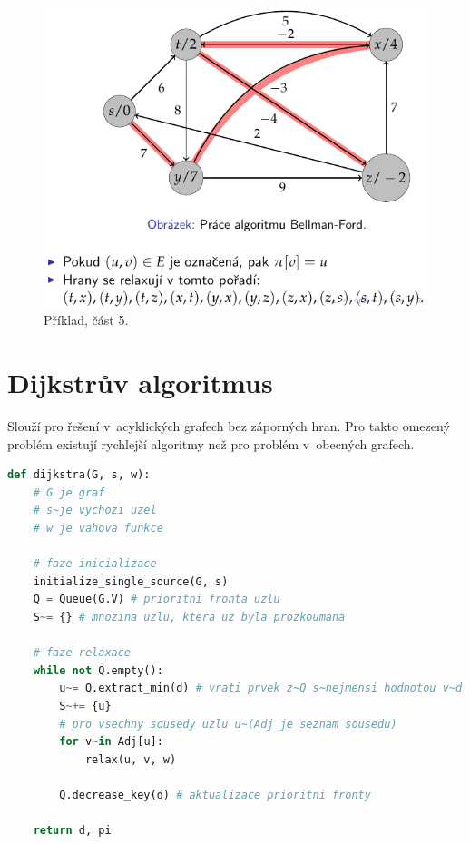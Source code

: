 \begin{figure}[H]
    \centering
    \includegraphics[width=0.75\linewidth]{example_bellman_ford_p5.pdf}
    \caption{Příklad, část 5.}
\end{figure}


\section{Dijkstrův algoritmus}

Slouží pro řešení v~acyklických grafech bez záporných hran. Pro takto omezený problém existují rychlejší algoritmy než pro problém v~obecných grafech.

\bigskip\noindent\begin{minipage}{\linewidth}
\begin{lstlisting}[language=Python, caption={Algoritmus Dijkstra.}]
def dijkstra(G, s, w):
    # G je graf
    # s~je vychozi uzel
    # w je vahova funkce

    # faze inicializace
    initialize_single_source(G, s)
    Q = Queue(G.V) # prioritni fronta uzlu
    S~= {} # mnozina uzlu, ktera uz byla prozkoumana

    # faze relaxace
    while not Q.empty():
        u~= Q.extract_min(d) # vrati prvek z~Q s~nejmensi hodnotou v~d
        S~+= {u}
        # pro vsechny sousedy uzlu u~(Adj je seznam sousedu)
        for v~in Adj[u]:
            relax(u, v, w)

        Q.decrease_key(d) # aktualizace prioritni fronty

    return d, pi
\end{lstlisting}
\end{minipage}

